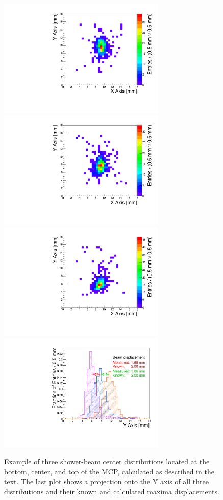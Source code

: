 \documentclass[twocolumn]{article}
\begin{document}
\begin{figure}[htbp]
	\centering
	\includegraphics[width=8cm]{Images/centers/run30dist.pdf}
	\includegraphics[width=8cm]{Images/centers/run32dist.pdf}
	\includegraphics[width=8cm]{Images/centers/run34dist.pdf}
	\includegraphics[width=8cm]{Images/centers/superimposed.pdf}
	\caption{\small Example of three shower-beam center distributions located at the bottom, center, and top of the MCP, calculated as described in the text. The last plot shows a projection onto the Y axis of all three distributions and their known and calculated maxima displacements.}
	\label{fig:centers}
\end{figure}
\end{document}
